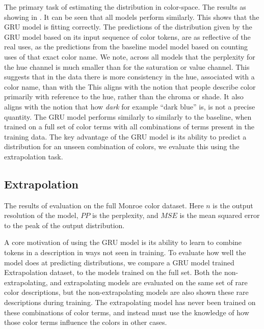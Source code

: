 \documentclass[11pt,letterpaper]{article}
\begin{document}
The primary task of estimating the distribution in color-space.
The results as showing in .
It can be seen that all models perform similarly.
This shows that the GRU model is fitting correctly.
The predictions of the distribution given by the GRU model based on its input sequence of color tokens,
are as reflective of the real uses, as the predictions from the baseline model model based on counting uses of that exact color name.
We note, across all models that the perplexity for the hue channel is much smaller than for the saturation or value channel.
This suggests that in the data there is more consistency in the hue, associated with a color name, than with the 
This aligns with the notion that people describe color primarily with reference to the hue, rather than the chroma or shade.
It also aligns with the notion that how \emph{dark} for example ``dark blue'' is, is not a precise quantity.
The GRU model performs similarly to similarly to the baseline, when trained on a full set of color terms with all combinations of terms present in the training data.
The key advantage of the GRU model is its ability to predict a distribution for an unseen combination of colors, we evaluate this using the extrapolation task.

\subsection{Extrapolation}

\begin{table*}
	\centering
	\caption{\label{tblresextrapo} The results of evaluation on the full Monroe color dataset. Here $n$ is the output resolution of the model, $PP$ is the perplexity, and $MSE$ is the mean squared error to the peak of the output distribution.}
\end{table*}


A core motivation of using the GRU model is its ability to learn to combine tokens in a description in ways not seen in training.
To evaluate how well the model does at predicting distributions,
we compare a GRU model trained Extrapolation dataset, to the models trained on the full set.
Both the non-extrapolating, and extrapolating models are evaluated on the same set of rare color descriptions,
but the non-extrapolating models are also shown these rare descriptions during training.
The extrapolating model has never been trained on these combinations of color terms,
and instead must use the knowledge of how those color terms influence the colors in other cases.
\end{document}
